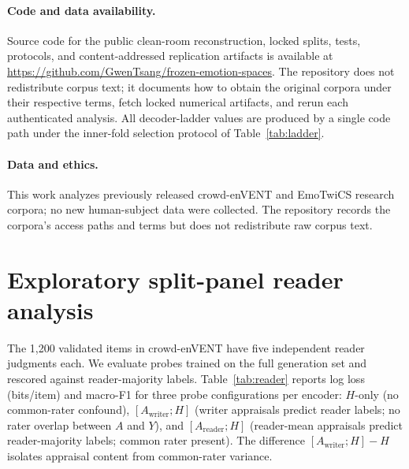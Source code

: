 \documentclass[11pt]{article}
\begin{document}
\paragraph{Code and data availability.} Source code for the public clean-room reconstruction, locked splits, tests, protocols, and content-addressed replication artifacts is available at \url{https://github.com/GwenTsang/frozen-emotion-spaces}. The repository does not redistribute corpus text; it documents how to obtain the original corpora under their respective terms, fetch locked numerical artifacts, and rerun each authenticated analysis. All decoder-ladder values are produced by a single code path under the inner-fold selection protocol of Table~\ref{tab:ladder}.

\paragraph{Data and ethics.} This work analyzes previously released crowd-enVENT and EmoTwiCS research corpora; no new human-subject data were collected. The repository records the corpora's access paths and terms but does not redistribute raw corpus text.




\appendix
\section{Exploratory split-panel reader analysis}
\label{app:reader}

The 1{,}200 validated items in crowd-enVENT have five independent reader judgments each. We evaluate probes trained on the full generation set and rescored against reader-majority labels. Table~\ref{tab:reader} reports log loss (bits/item) and macro-F1 for three probe configurations per encoder: $H$-only (no common-rater confound), $[A_{\mathrm{writer}};H]$ (writer appraisals predict reader labels; no rater overlap between $A$ and $Y$), and $[A_{\mathrm{reader}};H]$ (reader-mean appraisals predict reader-majority labels; common rater present). The difference $[A_{\mathrm{writer}};H]-H$ isolates appraisal content from common-rater variance.
\end{document}

